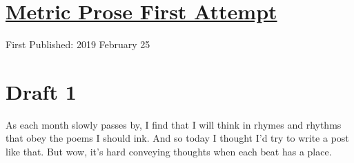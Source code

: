 \documentclass[12pt]{article}[titlepage]
\newcommand{\1}{\={a}}
\newcommand{\2}{\={e}}
\newcommand{\3}{\={\i}}
\newcommand{\4}{\=o}
\newcommand{\5}{\=u}
\newcommand{\6}{\={A}}
\renewcommand{\,}{\textsuperscript{,}}
\begin{document}
\doublespacing
\section{\href{metric-prose-1.html}{Metric Prose First Attempt}}
First Published: 2019 February 25
\section{Draft 1}
As each month slowly passes by,
I find that I will think
in rhymes and rhythms that obey
the poems I should ink.
And so today I thought I'd try
to write a post like that.
But wow, it's hard conveying thoughts
when each beat has a place. 
\end{document}

